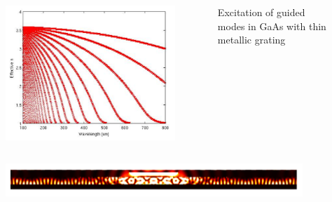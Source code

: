 \documentclass{beamer}
\begin{document}
\begin{frame}
	\begin{columns}

		\begin{column}{0.5\textwidth}
			\begin{figure}
				\includegraphics[width=\textwidth]{../images/antenaThz/gaas_mod_structure.png}\\
			\end{figure}
		\end{column}
		\begin{column}{0.5\textwidth}
			Excitation of guided modes in GaAs with thin metallic grating
			{\tiny \cite{Stolarek2011}}
		\end{column}
	\end{columns}
	\begin{figure}
		\includegraphics[width=\textwidth]{../images/antenaThz/final_stru.png}\\
	\end{figure}
	{\tiny \cite{Szczytko2012271}}
\end{frame}
\end{document}
